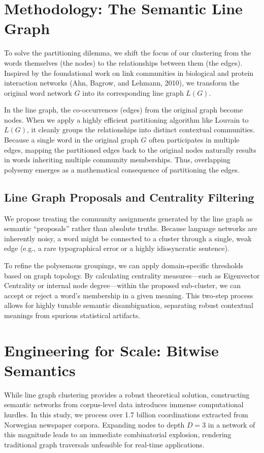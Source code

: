 \documentclass[11pt, a4paper]{article}
\begin{document}
\section{Methodology: The Semantic Line Graph}
To solve the partitioning dilemma, we shift the focus of our clustering from the words themselves (the nodes) to the relationships between them (the edges). Inspired by the foundational work on link communities in biological and protein interaction networks (Ahn, Bagrow, and Lehmann, 2010), we transform the original word network $G$ into its corresponding line graph $L(G)$. 

In the line graph, the co-occurrences (edges) from the original graph become nodes. When we apply a highly efficient partitioning algorithm like Louvain to $L(G)$, it cleanly groups the relationships into distinct contextual communities. Because a single word in the original graph $G$ often participates in multiple edges, mapping the partitioned edges back to the original nodes naturally results in words inheriting multiple community memberships. Thus, overlapping polysemy emerges as a mathematical consequence of partitioning the edges.

\subsection{Line Graph Proposals and Centrality Filtering}
We propose treating the community assignments generated by the line graph as semantic ``proposals'' rather than absolute truths. Because language networks are inherently noisy, a word might be connected to a cluster through a single, weak edge (e.g., a rare typographical error or a highly idiosyncratic sentence).

To refine the polysemous groupings, we can apply domain-specific thresholds based on graph topology. By calculating centrality measures—such as Eigenvector Centrality or internal node degree—within the proposed sub-cluster, we can accept or reject a word's membership in a given meaning. This two-step process allows for highly tunable semantic disambiguation, separating robust contextual meanings from spurious statistical artifacts.

\section{Engineering for Scale: Bitwise Semantics}
While line graph clustering provides a robust theoretical solution, constructing semantic networks from corpus-level data introduces immense computational hurdles. In this study, we process over 1.7 billion coordinations extracted from Norwegian newspaper corpora. Expanding nodes to depth $D=3$ in a network of this magnitude leads to an immediate combinatorial explosion, rendering traditional graph traversals unfeasible for real-time applications.
\end{document}
